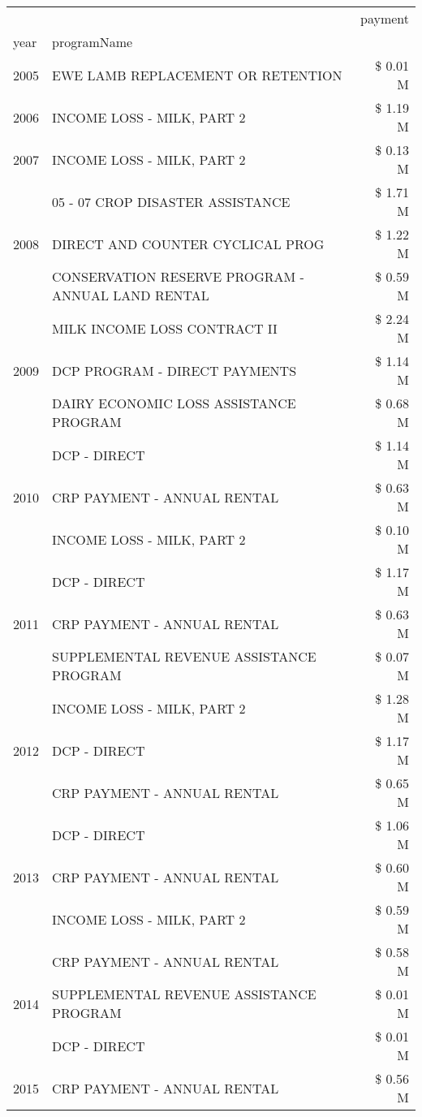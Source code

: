 \begin{tabular}{llr}
\toprule
 &  & payment \\
year & programName &  \\
\midrule
2005 & EWE LAMB REPLACEMENT OR RETENTION & \$ 0.01 M \\
\cline{1-3}
2006 & INCOME LOSS - MILK, PART 2 & \$ 1.19 M \\
\cline{1-3}
2007 & INCOME LOSS - MILK, PART 2 & \$ 0.13 M \\
\cline{1-3}
\multirow[t]{3}{*}{2008} & 05 - 07 CROP DISASTER ASSISTANCE & \$ 1.71 M \\
 & DIRECT AND COUNTER CYCLICAL PROG & \$ 1.22 M \\
 & CONSERVATION RESERVE PROGRAM - ANNUAL LAND RENTAL & \$ 0.59 M \\
\cline{1-3}
\multirow[t]{3}{*}{2009} & MILK INCOME LOSS CONTRACT II & \$ 2.24 M \\
 & DCP PROGRAM - DIRECT PAYMENTS & \$ 1.14 M \\
 & DAIRY ECONOMIC LOSS ASSISTANCE PROGRAM & \$ 0.68 M \\
\cline{1-3}
\multirow[t]{3}{*}{2010} & DCP - DIRECT & \$ 1.14 M \\
 & CRP PAYMENT - ANNUAL RENTAL & \$ 0.63 M \\
 & INCOME LOSS - MILK, PART 2 & \$ 0.10 M \\
\cline{1-3}
\multirow[t]{3}{*}{2011} & DCP - DIRECT & \$ 1.17 M \\
 & CRP PAYMENT - ANNUAL RENTAL & \$ 0.63 M \\
 & SUPPLEMENTAL REVENUE ASSISTANCE PROGRAM & \$ 0.07 M \\
\cline{1-3}
\multirow[t]{3}{*}{2012} & INCOME LOSS - MILK, PART 2 & \$ 1.28 M \\
 & DCP - DIRECT & \$ 1.17 M \\
 & CRP PAYMENT - ANNUAL RENTAL & \$ 0.65 M \\
\cline{1-3}
\multirow[t]{3}{*}{2013} & DCP - DIRECT & \$ 1.06 M \\
 & CRP PAYMENT - ANNUAL RENTAL & \$ 0.60 M \\
 & INCOME LOSS - MILK, PART 2 & \$ 0.59 M \\
\cline{1-3}
\multirow[t]{3}{*}{2014} & CRP PAYMENT - ANNUAL RENTAL & \$ 0.58 M \\
 & SUPPLEMENTAL REVENUE ASSISTANCE PROGRAM & \$ 0.01 M \\
 & DCP - DIRECT & \$ 0.01 M \\
\cline{1-3}
\multirow[t]{3}{*}{2015} & CRP PAYMENT - ANNUAL RENTAL & \$ 0.56 M \\

\end{tabular}
